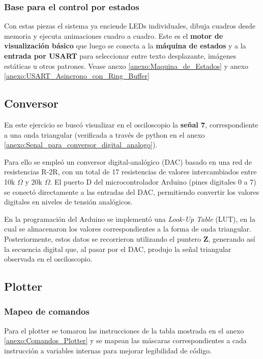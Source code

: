 \subsubsection{Base para el control por estados}
Con estas piezas el sistema ya enciende LEDs individuales, dibuja cuadros desde memoria y ejecuta animaciones cuadro a cuadro. Este es el \textbf{motor de visualización básico} que luego se conecta a la \textbf{máquina de estados} y a la \textbf{entrada por USART} para seleccionar entre texto desplazante, imágenes estáticas u otros patrones. Vease anexo \ref{anexo:Maquina_de_Estados} y anexo \ref{anexo:USART_Asincrono_con_Ring_Buffer}


\subsection{Conversor}
En este ejercicio se buscó visualizar en el osciloscopio la \textbf{señal 7}, correspondiente a una onda triangular (verificada a través de python en el anexo \ref{anexo:Senal_para_conversor_digital_analogo}).

Para ello se empleó un conversor digital-analógico (DAC) basado en una red de resistencias R-2R, con un total de 17 resistencias de valores intercambiados entre 10k $\Omega$ y 20k $\Omega$. El puerto D del microcontrolador Arduino (pines digitales 0 a 7) se conectó directamente a las entradas del DAC, permitiendo convertir los valores digitales en niveles de tensión analógicos.

En la programación del Arduino se implementó una \textit{Look-Up Table} (LUT), en la cual se almacenaron los valores correspondientes a la forma de onda triangular. Posteriormente, estos datos se recorrieron utilizando el puntero \textbf{Z}, generando así la secuencia digital que, al pasar por el DAC, produjo la señal triangular observada en el osciloscopio.

\subsection{Plotter}

\subsubsection{Mapeo de comandos}
Para el plotter se tomaron las instrucciones de la tabla mostrada en el anexo \ref{anexo:Comandos_Plotter} y se mapean las máscaras correspondientes a cada instrucción a variables internas para mejorar legibilidad de código.

